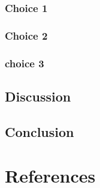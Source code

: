 \documentclass[letterpaper,10pt]{article}
\begin{document}
		\subsubsection{Choice 1}
		
		\subsubsection{Choice 2}
		
		\subsubsection{choice 3}
		
	\subsection{Discussion}
	
	\subsection{Conclusion}
	
\section{References}
\end{document}
